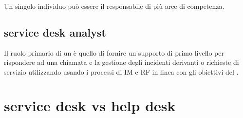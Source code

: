 Un singolo individuo può essere il responsabile di più aree di competenza.

\subsection[Service Desk Analyst]{service desk analyst}
\label{sd-sd-analyst}
Il ruolo primario di un  è quello di fornire un supporto di primo livello per rispondere ad una chiamata e la gestione degli incidenti derivanti o richieste di servizio utilizzando usando i processi di \acf{IM} e \acf{RF} in linea con gli obiettivi del .

\section[Service Desk vs Help Desk]{service desk vs help desk}
\label{sd-sd-vs-hd}














